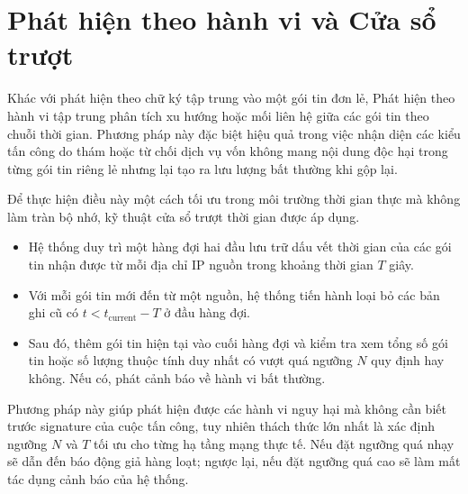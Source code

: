 \section{Phát hiện theo hành vi và Cửa sổ trượt}
Khác với phát hiện theo chữ ký tập trung vào một gói tin đơn lẻ, Phát hiện theo hành vi tập trung phân tích xu hướng hoặc mối liên hệ giữa các gói tin theo chuỗi thời gian. Phương pháp này đặc biệt hiệu quả trong việc nhận diện các kiểu tấn công do thám hoặc từ chối dịch vụ vốn không mang nội dung độc hại trong từng gói tin riêng lẻ nhưng lại tạo ra lưu lượng bất thường khi gộp lại.

Để thực hiện điều này một cách tối ưu trong môi trường thời gian thực mà không làm tràn bộ nhớ, kỹ thuật cửa sổ trượt thời gian được áp dụng.
\begin{itemize}
    \item Hệ thống duy trì một hàng đợi hai đầu lưu trữ dấu vết thời gian của các gói tin nhận được từ mỗi địa chỉ IP nguồn trong khoảng thời gian $T$ giây.
    \item Với mỗi gói tin mới đến từ một nguồn, hệ thống tiến hành loại bỏ các bản ghi cũ có $t < t_{\text{current}} - T$ ở đầu hàng đợi.
    \item Sau đó, thêm gói tin hiện tại vào cuối hàng đợi và kiểm tra xem tổng số gói tin hoặc số lượng thuộc tính duy nhất có vượt quá ngưỡng $N$ quy định hay không. Nếu có, phát cảnh báo về hành vi bất thường.
\end{itemize}

Phương pháp này giúp phát hiện được các hành vi nguy hại mà không cần biết trước signature của cuộc tấn công, tuy nhiên thách thức lớn nhất là xác định ngưỡng $N$ và $T$ tối ưu cho từng hạ tầng mạng thực tế. Nếu đặt ngưỡng quá nhạy sẽ dẫn đến báo động giả hàng loạt; ngược lại, nếu đặt ngưỡng quá cao sẽ làm mất tác dụng cảnh báo của hệ thống.

